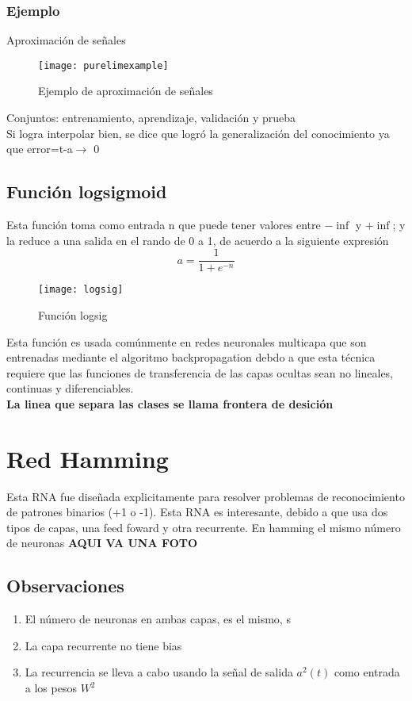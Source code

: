 \documentclass{article}
\begin{document}
\subsubsection{Ejemplo}
Aproximación de señales\\
\begin{figure}[h!]
	\centering
	\texttt{[image: purelimexample]}
	\caption{Ejemplo de aproximación de señales}
\end{figure}
Conjuntos: entrenamiento, aprendizaje, validación y prueba\\
Si logra interpolar bien, se dice que logró la generalización del conocimiento ya que error=t-a$\rightarrow$ 0
\subsection{Función logsigmoid}
Esta función toma como entrada n que puede tener valores entre $-\inf$ y $+\inf$; y la reduce a una salida en el rando de 0 a 1, de acuerdo a la siguiente expresión
$$a = \frac{1}{1 + e^{-n}}$$
\begin{figure}[h!]
	\centering
	\texttt{[image: logsig]}
	\caption{Función logsig}
\end{figure}
Esta función es usada comúnmente en redes neuronales multicapa que son entrenadas mediante el algoritmo backpropagation debdo a que esta técnica requiere que las funciones de transferencia de las capas ocultas sean no lineales, continuas y diferenciables.\\
\textbf{La linea que separa las clases se llama frontera de desición}

\section{Red Hamming}
Esta RNA fue diseñada explicitamente para resolver problemas de reconocimiento de patrones binarios (+1 o -1). Esta RNA es interesante, debido a que usa dos tipos de capas, una feed foward y otra recurrente. En hamming el mismo número de neuronas \textbf{AQUI VA UNA FOTO}\\

\subsection{Observaciones}
\begin{enumerate}
	\item El número de neuronas en ambas capas, es el mismo, s
	\item La capa recurrente no tiene bias
	\item La recurrencia se lleva a cabo usando la señal de salida $a^2(t)$ como entrada a los pesos $W^2$
\end{enumerate}
\end{document}
